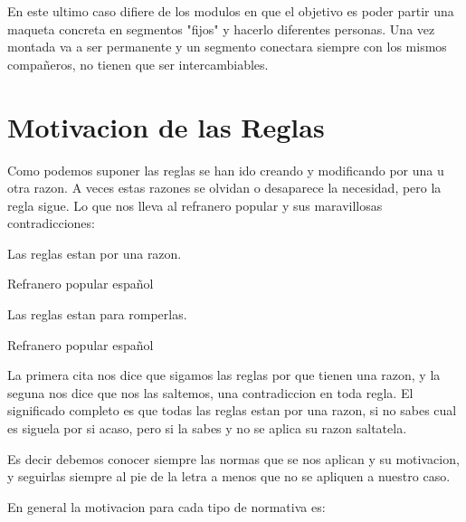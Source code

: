 En este ultimo caso difiere de los modulos en que el objetivo es poder partir una maqueta concreta en segmentos "fijos" y hacerlo diferentes personas. Una vez montada va a ser permanente y un segmento conectara siempre con los mismos compañeros, no tienen que ser intercambiables.

\section{Motivacion de las Reglas}
Como podemos suponer las reglas se han ido creando y modificando por una u otra razon. A veces estas razones se olvidan o desaparece la necesidad, pero la regla sigue. Lo que nos lleva al refranero popular y sus maravillosas contradicciones:

\epigraph{Las reglas estan por una razon.}{Refranero popular español}

\epigraph{Las reglas estan para romperlas.}{Refranero popular español}

La primera cita nos dice que sigamos las reglas por que tienen una razon, y la seguna nos dice que nos las saltemos, una contradiccion en toda regla. El significado completo es que todas las reglas estan por una razon, si no sabes cual es siguela por si acaso, pero si la sabes y no se aplica su razon saltatela.

Es decir debemos conocer siempre las normas que se nos aplican y su motivacion, y seguirlas siempre al pie de la letra a menos que no se apliquen a nuestro caso.

En general la motivacion para cada tipo de normativa es:

